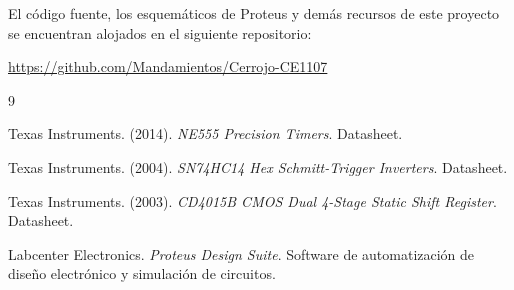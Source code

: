 \documentclass[12pt]{article}
\begin{document}
El código fuente, los esquemáticos de Proteus y demás recursos de este proyecto se encuentran alojados en el siguiente repositorio:

\url{https://github.com/Mandamientos/Cerrojo-CE1107}

\renewcommand{\refname}{Referencias Bibliográficas}
\begin{thebibliography}{9}

Texas Instruments. (2014). \textit{NE555 Precision Timers}. Datasheet. 

Texas Instruments. (2004). \textit{SN74HC14 Hex Schmitt-Trigger Inverters}. Datasheet. 

Texas Instruments. (2003). \textit{CD4015B CMOS Dual 4-Stage Static Shift Register}. Datasheet. 

Labcenter Electronics. \textit{Proteus Design Suite}. Software de automatización de diseño electrónico y simulación de circuitos.

\end{thebibliography}
\end{document}
